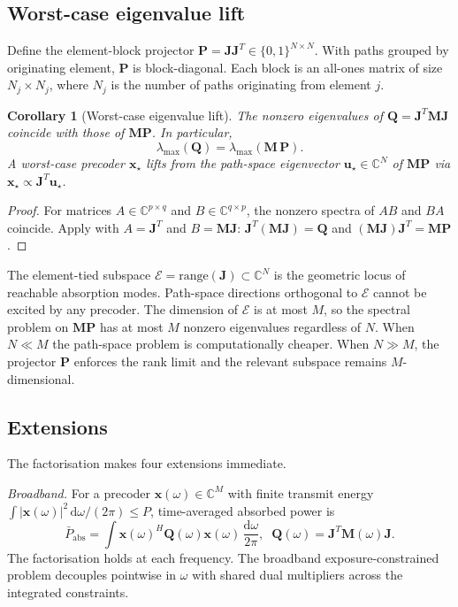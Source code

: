 \documentclass[journal,twocolumn,10pt]{IEEEtran}
\theoremstyle{plain}
\newtheorem{corollary}[theorem]{Corollary}
\theoremstyle{remark}
\newcommand{\xx}{\mathbf{x}}
\newcommand{\Qmat}{\mathbf{Q}}
\newcommand{\Mmat}{\mathbf{M}}
\newcommand{\Jmat}{\mathbf{J}}
\newcommand{\Pmat}{\mathbf{P}}
\newcommand{\diff}{\mathrm{d}}
\newcommand{\Complex}{\mathbb{C}}
\begin{document}
\subsection{Worst-case eigenvalue lift}

Define the element-block projector $\Pmat = \Jmat \Jmat^T \in
\{0,1\}^{N \times N}$. With paths grouped by originating element,
$\Pmat$ is block-diagonal. Each block is an all-ones matrix of size
$N_j \times N_j$, where $N_j$ is the number of paths originating
from element $j$.

\begin{corollary}[Worst-case eigenvalue lift]\label{cor:lambda-lift}
The nonzero eigenvalues of $\Qmat = \Jmat^T \Mmat \Jmat$ coincide
with those of $\Mmat \Pmat$. In particular,
\begin{equation}\label{eq:lambda-lift}
  \lambda_{\max}(\Qmat) = \lambda_{\max}(\Mmat\,\Pmat).
\end{equation}
A worst-case precoder $\xx_\star$ lifts from the path-space
eigenvector $\mathbf{u}_\star \in \Complex^N$ of $\Mmat \Pmat$ via
$\xx_\star \propto \Jmat^T \mathbf{u}_\star$.
\end{corollary}

\begin{proof}
For matrices $A \in \Complex^{p \times q}$ and $B \in \Complex^{q
\times p}$, the nonzero spectra of $AB$ and $BA$ coincide. Apply
with $A = \Jmat^T$ and $B = \Mmat \Jmat$: $\Jmat^T (\Mmat \Jmat) =
\Qmat$ and $(\Mmat \Jmat) \Jmat^T = \Mmat \Pmat$.
\end{proof}

The element-tied subspace $\mathcal{E} = \mathrm{range}(\Jmat)
\subset \Complex^N$ is the geometric locus of reachable absorption
modes. Path-space directions orthogonal to $\mathcal{E}$ cannot be
excited by any precoder. The dimension of $\mathcal{E}$ is at most
$M$, so the spectral problem on $\Mmat \Pmat$ has at most $M$
nonzero eigenvalues regardless of $N$. When $N \ll M$ the
path-space problem is computationally cheaper. When $N \gg M$, the
projector $\Pmat$ enforces the rank limit and the relevant subspace
remains $M$-dimensional.

\subsection{Extensions}

The factorisation makes four extensions immediate.

\emph{Broadband.} For a precoder $\xx(\omega) \in \Complex^M$ with
finite transmit energy $\int |\xx(\omega)|^2\,\diff\omega/(2\pi) \leq
P$, time-averaged absorbed power is
\begin{equation*}
  \bar{P}_{\mathrm{abs}} = \int \xx(\omega)^H \Qmat(\omega)
  \xx(\omega)\,\frac{\diff\omega}{2\pi},
  \;\;
  \Qmat(\omega) = \Jmat^T \Mmat(\omega) \Jmat.
\end{equation*}
The factorisation holds at each frequency. The broadband
exposure-constrained problem decouples pointwise in $\omega$ with
shared dual multipliers across the integrated constraints.
\end{document}
